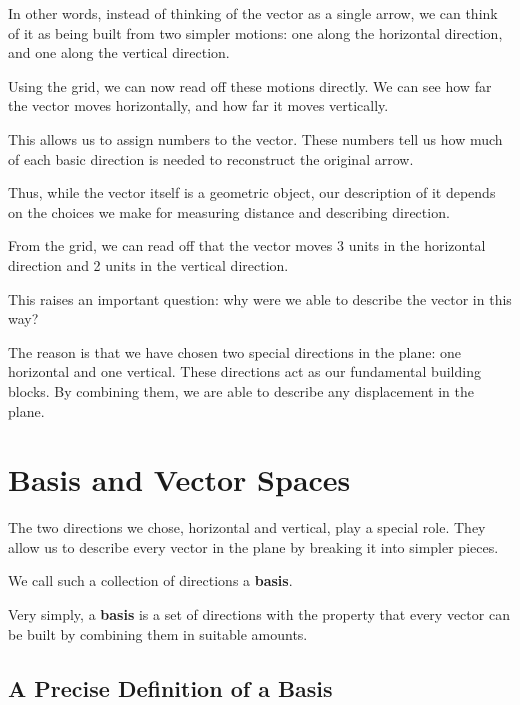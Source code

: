 \documentclass[11pt,openany]{book}
\theoremstyle{definition}
\begin{document}
\medskip

In other words, instead of thinking of the vector as a single arrow, we can think of it as being built from two simpler motions:
one along the horizontal direction, and one along the vertical direction.

\medskip

Using the grid, we can now read off these motions directly. 
We can see how far the vector moves horizontally, and how far it moves vertically.

\medskip

This allows us to assign numbers to the vector. These numbers tell us how much of each basic direction is needed to reconstruct the original arrow.

\medskip

Thus, while the vector itself is a geometric object, our description of it depends on the choices we make for measuring distance and describing direction.

\medskip

From the grid, we can read off that the vector moves 3 units in the horizontal direction and 2 units in the vertical direction.

\medskip

This raises an important question: why were we able to describe the vector in this way?

\medskip

The reason is that we have chosen two special directions in the plane: one horizontal and one vertical. 
These directions act as our fundamental building blocks. By combining them, we are able to describe any displacement in the plane.


\section{Basis and Vector Spaces}

The two directions we chose, horizontal and vertical, play a special role. 
They allow us to describe every vector in the plane by breaking it into simpler pieces.

We call such a collection of directions a \textbf{basis}.


Very simply, a \textbf{basis} is a set of directions with the property that every vector can be built by combining them in suitable amounts.


\subsection{A Precise Definition of a Basis}
\end{document}
